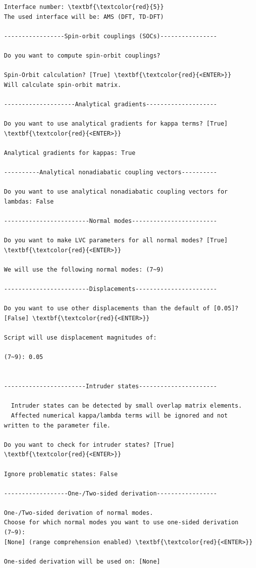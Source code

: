 \documentclass[a4paper,11pt,DIV=15,openany]{scrbook}
\begin{document}
\begin{oframed}
\begin{Verbatim}[commandchars=\\\{\}]
Interface number: \textbf{\textcolor{red}{5}}
The used interface will be: AMS (DFT, TD-DFT)

-----------------Spin-orbit couplings (SOCs)----------------

Do you want to compute spin-orbit couplings?

Spin-Orbit calculation? [True] \textbf{\textcolor{red}{<ENTER>}}
Will calculate spin-orbit matrix.

--------------------Analytical gradients--------------------

Do you want to use analytical gradients for kappa terms? [True] \textbf{\textcolor{red}{<ENTER>}}

Analytical gradients for kappas: True

----------Analytical nonadiabatic coupling vectors----------

Do you want to use analytical nonadiabatic coupling vectors for lambdas: False

------------------------Normal modes------------------------

Do you want to make LVC parameters for all normal modes? [True] \textbf{\textcolor{red}{<ENTER>}}

We will use the following normal modes: (7~9)

------------------------Displacements-----------------------

Do you want to use other displacements than the default of [0.05]? [False] \textbf{\textcolor{red}{<ENTER>}}

Script will use displacement magnitudes of:

(7~9): 0.05
 

-----------------------Intruder states----------------------

  Intruder states can be detected by small overlap matrix elements.
  Affected numerical kappa/lambda terms will be ignored and not written to the parameter file.

Do you want to check for intruder states? [True] \textbf{\textcolor{red}{<ENTER>}}

Ignore problematic states: False

------------------One-/Two-sided derivation-----------------

One-/Two-sided derivation of normal modes.
Choose for which normal modes you want to use one-sided derivation (7~9): 
[None] (range comprehension enabled) \textbf{\textcolor{red}{<ENTER>}}

One-sided derivation will be used on: [None]



\end{Verbatim}
\end{oframed}
\end{document}
